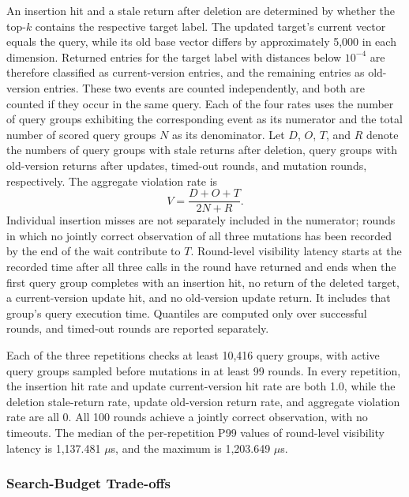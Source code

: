\documentclass[sigconf,pbalance]{acmart}
\begin{document}
An insertion hit and a stale return after deletion are determined by whether the top-$k$ contains the respective target label. The updated target's current vector equals the query, while its old base vector differs by approximately 5,000 in each dimension. Returned entries for the target label with distances below $10^{-4}$ are therefore classified as current-version entries, and the remaining entries as old-version entries. These two events are counted independently, and both are counted if they occur in the same query. Each of the four rates uses the number of query groups exhibiting the corresponding event as its numerator and the total number of scored query groups $N$ as its denominator. Let $D$, $O$, $T$, and $R$ denote the numbers of query groups with stale returns after deletion, query groups with old-version returns after updates, timed-out rounds, and mutation rounds, respectively. The aggregate violation rate is
\begin{equation}
\label{eq:audit-violation}
V=\frac{D+O+T}{2N+R}.
\end{equation}
Individual insertion misses are not separately included in the numerator; rounds in which no jointly correct observation of all three mutations has been recorded by the end of the wait contribute to $T$. Round-level visibility latency starts at the recorded time after all three calls in the round have returned and ends when the first query group completes with an insertion hit, no return of the deleted target, a current-version update hit, and no old-version update return. It includes that group's query execution time. Quantiles are computed only over successful rounds, and timed-out rounds are reported separately.

Each of the three repetitions checks at least 10,416 query groups, with active query groups sampled before mutations in at least 99 rounds. In every repetition, the insertion hit rate and update current-version hit rate are both 1.0, while the deletion stale-return rate, update old-version return rate, and aggregate violation rate are all 0. All 100 rounds achieve a jointly correct observation, with no timeouts. The median of the per-repetition P99 values of round-level visibility latency is 1,137.481 $\mu$s, and the maximum is 1,203.649 $\mu$s.

\subsubsection{Search-Budget Trade-offs}
\label{sec:quality-cost}
\end{document}
